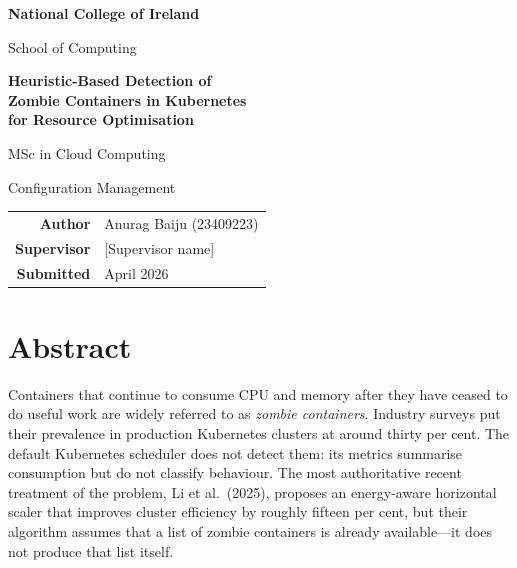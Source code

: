 \documentclass[11pt,a4paper,oneside]{article}
\begin{document}
\begin{titlepage}
    \centering
    \vspace*{2cm}
    {\Large\bfseries National College of Ireland \par}
    \vspace{0.5cm}
    {\large School of Computing \par}
    \vspace{3cm}
    {\Huge\bfseries Heuristic-Based Detection of \\[0.3em]
                    Zombie Containers in Kubernetes \\[0.3em]
                    for Resource Optimisation \par}
    \vspace{2cm}
    {\Large MSc in Cloud Computing \par}
    \vspace{0.3cm}
    {\large Configuration Management \par}
    \vfill
    \begin{tabular}{rl}
        \textbf{Author}     & Anurag Baiju (23409223) \\[0.2em]
        \textbf{Supervisor} & [Supervisor name] \\[0.2em]
        \textbf{Submitted}  & April 2026 \\
    \end{tabular}
    \vspace{1cm}
\end{titlepage}

\section*{Abstract}
Containers that continue to consume CPU and memory after they have ceased to
do useful work are widely referred to as \emph{zombie containers}. Industry
surveys put their prevalence in production Kubernetes clusters at around
thirty per cent. The default Kubernetes scheduler does not detect them: its
metrics summarise consumption but do not classify behaviour. The most
authoritative recent treatment of the problem, Li et al.~(2025), proposes an
energy-aware horizontal scaler that improves cluster efficiency by roughly
fifteen per cent, but their algorithm assumes that a list of zombie containers
is already available---it does not produce that list itself.
\end{document}
